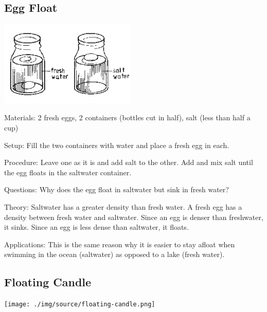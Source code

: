 \begin{multicols}{2}
\subsection{Egg Float}

\begin{center}
\includegraphics[width=0.49\textwidth]{./img/source/egg-float.png}
\end{center}

\begin{description*}
\item[Materials:]{2 fresh eggs, 2 containers (bottles cut in half), salt (less than half a cup)}
\item[Setup:]{Fill the two containers with water and place a fresh egg in each.}
\item[Procedure:]{Leave one as it is and add salt to the other. Add and mix salt until the egg floats in the saltwater container.}
\item[Questions:]{Why does the egg float in saltwater but sink in fresh water?}
\item[Theory:]{Saltwater has a greater density than fresh water. A fresh egg has a density between fresh water and saltwater. Since an egg is denser than freshwater, it sinks. Since an egg is less dense than saltwater, it floats.}
\item[Applications:]{This is the same reason why it is easier to stay afloat when swimming in the ocean (saltwater) as opposed to a lake (fresh water).}
\end{description*}

\subsection{Floating Candle}

\begin{center}
\texttt{[image: ./img/source/floating-candle.png]}
\end{center}


\end{multicols}
